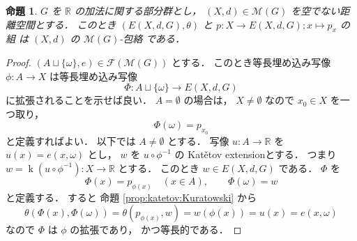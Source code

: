 \documentclass[leqno, 12pt]{jsarticle}
\newtheorem{prop}[thm]{命題}
\newcommand{\rr}{\mathbb{R}}
\DeclareMathOperator{\kat}{k}
\newcommand{\KatExt}[1]{\kat(#1)}
\newcommand{\Met}[1]{\mathscr{M}(#1)}
\newcommand{\FinitePart}[1]{\mathscr{F}(#1)}
\newcommand{\FinMet}[1]{\FinitePart{\Met{#1}}}
\newcommand{\Espace}[3]{E(#1,#2,#3)}
\newcommand{\KatDist}{\theta}
\newcommand{\kura}[1]{p_{#1}}
\begin{document}
\begin{prop}\label{prop:func:injE}
$G$
を
$\rr$
の加法に関する部分群とし，
$(X, d)\in \Met{G}$
を空でない距離空間とする．
このとき
$(\Espace{X}{d}{G}, \KatDist)$
と
$p\colon  X\to \Espace{X}{d}{G}; x\mapsto \kura{x}$
の組
は
$(X, d)$
の
$\Met{G}$-包絡
である．
\end{prop}
\begin{proof}

$(A\sqcup\{ \omega\},e)\in\FinMet{G}$
とする．
このとき等長埋め込み写像
$\phi\colon  A \to X$
は等長埋め込み写像
\[
\Phi\colon A\sqcup \{\omega\}\to \Espace{X}{d}{G}
\]
に拡張されることを示せば良い．
$A=\emptyset$
の場合は，
$X\neq\emptyset$
なので
$x_0\in X$
を一つ取り，
\[
\Phi(\omega)=\kura{x_0}
\]
と定義すればよい．
以下では
$A\neq\emptyset$
とする．
写像
$u\colon A\to \rr$
を
$u(x)=e(x,\omega)$
とし，
$w$
を
$u\circ \phi^{-1}$
の
Kat\v{e}tov extensionとする．
つまり
$w=\KatExt{u\circ \phi^{-1}}\colon X\to \rr$
とする．
このとき
$w\in \Espace{X}{d}{G}$%
である．
$\Phi$
を
\[
\Phi(x)=\kura{\phi(x)}
\quad(x\in A),
\qquad
\Phi(\omega)=w
\]
と定義する．
すると
命題
\ref{prop:katetov:Kuratowski}
から
\[
\KatDist(\Phi(x), \Phi(\omega))
=\KatDist(\kura{\phi(x)}, w)
=w(\phi(x))
=u(x)
=e(x,\omega)
\]
なので
$\Phi$
は
$\phi$
の拡張であり，
かつ等長的である．
\end{proof}
\end{document}
